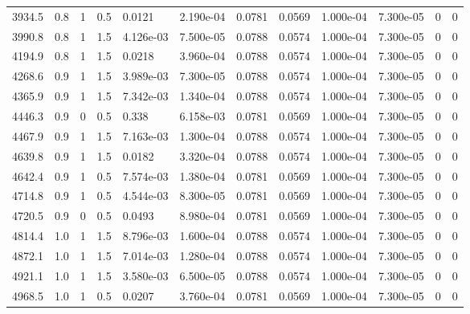 \documentclass[preview]{standalone}
\begin{document}
{{\begin{tabular}{L{1.2cm}C{1.2cm} C{0.3cm}C{0.5cm} C{1.4cm}C{1.4cm} C{1.4cm}C{1.4cm} C{1.6cm}C{1.6cm} C{1.6cm}C{1.6cm}}
  3934.5  &   0.8  & 1     & 0.5 &  0.0121  & 2.190e-04  &  0.0781&   0.0569& 1.000e-04 & 7.300e-05   &  0 & 0  \\ 
  3990.8  &   0.8  & 1     & 1.5 &  4.126e-03  & 7.500e-05  &  0.0788&   0.0574& 1.000e-04 & 7.300e-05   &  0 & 0  \\ 
  4194.9  &   0.8  & 1     & 1.5 &  0.0218  & 3.960e-04  &  0.0788&   0.0574& 1.000e-04 & 7.300e-05   &  0 & 0  \\ 
  4268.6  &   0.9  & 1     & 1.5 &  3.989e-03  & 7.300e-05  &  0.0788&   0.0574& 1.000e-04 & 7.300e-05   &  0 & 0  \\ 
  4365.9  &   0.9  & 1     & 1.5 &  7.342e-03  & 1.340e-04  &  0.0788&   0.0574& 1.000e-04 & 7.300e-05   &  0 & 0  \\ 
  4446.3  &   0.9  & 0     & 0.5 &  0.338  & 6.158e-03  &  0.0781&   0.0569& 1.000e-04 & 7.300e-05   &  0 & 0  \\ 
  4467.9  &   0.9  & 1     & 1.5 &  7.163e-03  & 1.300e-04  &  0.0788&   0.0574& 1.000e-04 & 7.300e-05   &  0 & 0  \\ 
  4639.8  &   0.9  & 1     & 1.5 &  0.0182  & 3.320e-04  &  0.0788&   0.0574& 1.000e-04 & 7.300e-05   &  0 & 0  \\ 
  4642.4  &   0.9  & 1     & 0.5 &  7.574e-03  & 1.380e-04  &  0.0781&   0.0569& 1.000e-04 & 7.300e-05   &  0 & 0  \\ 
  4714.8  &   0.9  & 1     & 0.5 &  4.544e-03  & 8.300e-05  &  0.0781&   0.0569& 1.000e-04 & 7.300e-05   &  0 & 0  \\ 
  4720.5  &   0.9  & 0     & 0.5 &  0.0493  & 8.980e-04  &  0.0781&   0.0569& 1.000e-04 & 7.300e-05   &  0 & 0  \\ 
  4814.4  &   1.0  & 1     & 1.5 &  8.796e-03  & 1.600e-04  &  0.0788&   0.0574& 1.000e-04 & 7.300e-05   &  0 & 0  \\ 
  4872.1  &   1.0  & 1     & 1.5 &  7.014e-03  & 1.280e-04  &  0.0788&   0.0574& 1.000e-04 & 7.300e-05   &  0 & 0  \\ 
  4921.1  &   1.0  & 1     & 1.5 &  3.580e-03  & 6.500e-05  &  0.0788&   0.0574& 1.000e-04 & 7.300e-05   &  0 & 0  \\ 
  4968.5  &   1.0  & 1     & 0.5 &  0.0207  & 3.760e-04  &  0.0781&   0.0569& 1.000e-04 & 7.300e-05   &  0 & 0  \\ 
\hline 
\end{tabular} 

}}
\end{document}

